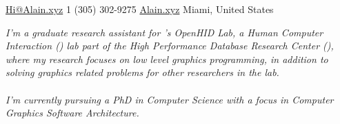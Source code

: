 \documentclass[10pt,a4paper]{article}
\begin{document}
 

\noindent\href{mailto:hi@Alain.xyz}{Hi@Alain.xyz}\bull
\textsmaller{+}1 (305) 302-9275 \bull
\href{https://alain.xyz}{Alain.xyz} \bull Miami, United States

\spacedhrule{0.9em}{-0.4em}


\begin{multicols}{2}


\noindent \textit{I'm a graduate research assistant for 's OpenHID Lab, a Human Computer Interaction () lab part of the High Performance Database Research Center (), where my research focuses on low level graphics programming, in addition to solving graphics related problems for other researchers in the lab. \\ \\ I'm currently pursuing a PhD in Computer Science with a focus in Computer Graphics Software Architecture.} \\



\end{multicols}
\end{document}
